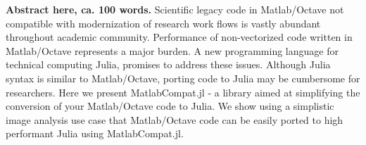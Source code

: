 \textbf{Abstract here, ca. 100 words.}
Scientific legacy code in Matlab/Octave not compatible with modernization of research work flows is vastly abundant throughout academic community. Performance of non-vectorized code written in Matlab/Octave represents a major burden. A new programming language for technical computing Julia, promises to address these issues. Although Julia syntax is similar to Matlab/Octave, porting code to Julia may be cumbersome for researchers. Here we present MatlabCompat.jl - a library aimed at simplifying the conversion of your Matlab/Octave code to Julia. We show using a simplistic image analysis use case that Matlab/Octave code can be easily ported to high performant Julia using MatlabCompat.jl.